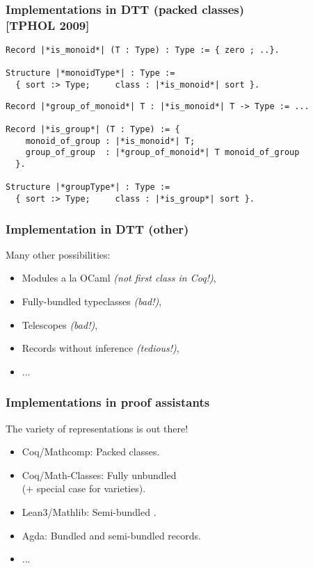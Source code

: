 \documentclass[11pt]{beamer}
\begin{document}
\begin{frame}[fragile]
  \frametitle{Implementations in DTT (packed classes) \\ \hfill [TPHOL
    2009]}

\begin{lstlisting}
Record |*is_monoid*| (T : Type) : Type := { zero ; ..}.

Structure |*monoidType*| : Type :=
  { sort :> Type;     class : |*is_monoid*| sort }.
\end{lstlisting}


\begin{lstlisting}
Record |*group_of_monoid*| T : |*is_monoid*| T -> Type := ...

Record |*is_group*| (T : Type) := {
    monoid_of_group : |*is_monoid*| T;
    group_of_group  : |*group_of_monoid*| T monoid_of_group
  }.

Structure |*groupType*| : Type :=
  { sort :> Type;     class : |*is_group*| sort }.
\end{lstlisting}

\end{frame}

\begin{frame}
  \frametitle{Implementation in DTT (other)}

  Many other possibilities:
  \vfill
  \begin{itemize}
  \item Modules a la {\sc OCaml} \emph{(not first class in {\sc Coq}!)},
  \vfill
  \item Fully-bundled typeclasses \emph{(bad!)},
  \vfill
  \item Telescopes \emph{(bad!)},
  \vfill
  \item Records without inference \emph{(tedious!)},
  \vfill
  \item ...
  \end{itemize}

\end{frame}

\begin{frame}
  \frametitle{Implementations in proof assistants}

  The variety of representations is out there!

  \begin{itemize}
  \item {\sc Coq/Mathcomp}:     Packed classes.
\item {\sc Coq/Math-Classes}: Fully unbundled  \\
    \hfill ($+$ special case for varieties).
  \item {\sc Lean3/Mathlib}:     Semi-bundled .
  \item {\sc Agda}:             Bundled and semi-bundled records.
  \item ...
  \end{itemize}
  \vfill
  \pause

  \vfill
  \pause


\end{frame}
\end{document}
